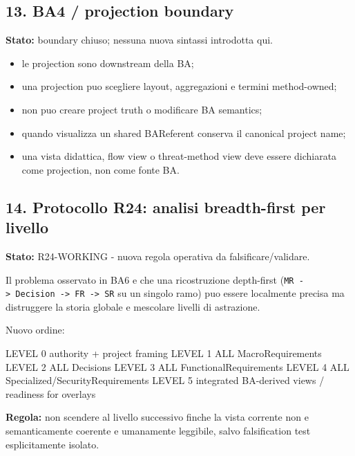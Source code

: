 \documentclass[
  9pt,
  a4paper,
]{article}
\newenvironment{Shaded}{}{}
\newcommand{\NormalTok}[1]{#1}
\providecommand{\tightlist}{%
  \setlength{\itemsep}{0pt}\setlength{\parskip}{0pt}}
\begin{document}
\subsection{13. BA4 / projection
boundary}\label{ba4-projection-boundary}

\textbf{Stato:} boundary chiuso; nessuna nuova sintassi introdotta qui.

\begin{itemize}
\tightlist
\item
  le projection sono downstream della BA;
\item
  una projection puo scegliere layout, aggregazioni e termini
  method-owned;
\item
  non puo creare project truth o modificare BA semantics;
\item
  quando visualizza un shared BAReferent conserva il canonical project
  name;
\item
  una vista didattica, flow view o threat-method view deve essere
  dichiarata come projection, non come fonte BA.
\end{itemize}

\subsection{14. Protocollo R24: analisi breadth-first per
livello}\label{protocollo-r24-analisi-breadth-first-per-livello}

\textbf{Stato:} R24-WORKING - nuova regola operativa da
falsificare/validare.

Il problema osservato in BA6 e che una ricostruzione depth-first
(\texttt{MR\ -\textgreater{}\ Decision\ -\textgreater{}\ FR\ -\textgreater{}\ SR}
su un singolo ramo) puo essere localmente precisa ma distruggere la
storia globale e mescolare livelli di astrazione.

Nuovo ordine:

\begin{Shaded}
\begin{Highlighting}[]
\NormalTok{LEVEL 0  authority + project framing}
\NormalTok{LEVEL 1  ALL MacroRequirements}
\NormalTok{LEVEL 2  ALL Decisions}
\NormalTok{LEVEL 3  ALL FunctionalRequirements}
\NormalTok{LEVEL 4  ALL Specialized/SecurityRequirements}
\NormalTok{LEVEL 5  integrated BA{-}derived views / readiness for overlays}
\end{Highlighting}
\end{Shaded}

\textbf{Regola:} non scendere al livello successivo finche la vista
corrente non e semanticamente coerente e umanamente leggibile, salvo
falsification test esplicitamente isolato.
\end{document}
